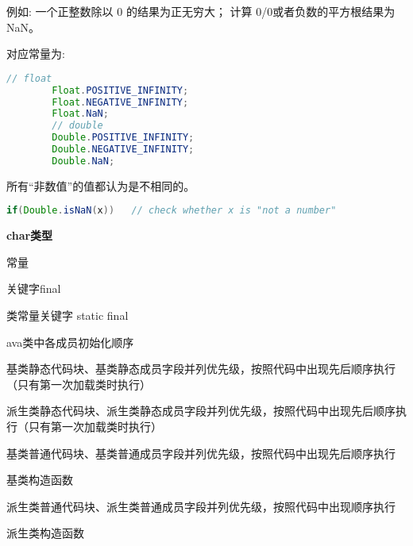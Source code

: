 例如: 一个正整数除以 0 的结果为正无穷大； 计算 0/0或者负数的平方根结果为NaN。

对应常量为:
\begin{lstlisting}[language=java]
        // float
        Float.POSITIVE_INFINITY;
        Float.NEGATIVE_INFINITY;
        Float.NaN;
        // double
        Double.POSITIVE_INFINITY;
        Double.NEGATIVE_INFINITY;
        Double.NaN;
\end{lstlisting}


所有“非数值”的值都认为是不相同的。

\begin{lstlisting}[language=java]
        if(Double.isNaN(x))   // check whether x is "not a number"
\end{lstlisting}










\textbf{char类型}



常量

关键字final

类常量关键字 static final

ava类中各成员初始化顺序


基类静态代码块、基类静态成员字段并列优先级，按照代码中出现先后顺序执行（只有第一次加载类时执行）

派生类静态代码块、派生类静态成员字段并列优先级，按照代码中出现先后顺序执行（只有第一次加载类时执行）

基类普通代码块、基类普通成员字段并列优先级，按照代码中出现先后顺序执行

基类构造函数

派生类普通代码块、派生类普通成员字段并列优先级，按照代码中出现顺序执行

派生类构造函数

































